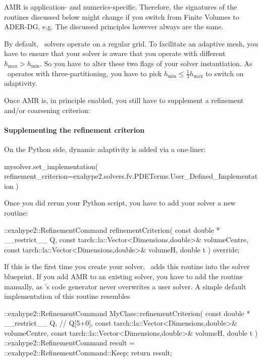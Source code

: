 \begin{remark}
 AMR is application- and numerics-specific. Therefore, the signatures of the
 routines discussed below might change if you switch from Finite Volumes to
 ADER-DG, e.g. The discussed principles however always are the same.
\end{remark}


By default, \ExaHyPE\ solvers operate on a regular grid.
To facilitate an adaptive mesh, you have to ensure that your solver is aware that you operate 
with different $h_{\text{max}}>h_{\text{min}}$. 
So you have to alter these two flags of your solver instantiation.
As \Peano\ operates with three-partitioning, you have to pick 
$h_{\text{min}} \leq \frac{1}{3} h_{\text{max}}$ to switch on adaptivity.

Once AMR is, in principle enabled, you still have to supplement a refinement and/or coarsening criterion:



\paragraph{Supplementing the refinement criterion}
%
On the Python side, dynamic adaptivity is added via a one-liner:

\begin{code}
mysolver.set_implementation(
 refinement_criterion=exahype2.solvers.fv.PDETerms.User_Defined_Implementation 
)
\end{code}


\noindent
Once you did rerun your Python script, you have to add your solver a new
routine:

\begin{code}
::exahype2::RefinementCommand refinementCriterion(
  const double * __restrict__ Q,
  const tarch::la::Vector<Dimensions,double>&  volumeCentre,
  const tarch::la::Vector<Dimensions,double>&  volumeH,
  double                                       t
) override;
\end{code}


\noindent
If this is the first time you create your solver, \ExaHyPE\ adds this routine
into the solver blueprint.
If you add AMR to an existing solver, you have to add the routine manually, as
\ExaHyPE's code generator never overwrites a user solver.
A simple default implementation of this routine resembles

\begin{code}
::exahype2::RefinementCommand MyClass::refinementCriterion(
  const double * __restrict__ Q, // Q[5+0],
  const tarch::la::Vector<Dimensions,double>&  volumeCentre,
  const tarch::la::Vector<Dimensions,double>&  volumeH,
  double                                       t
) {
  ::exahype2::RefinementCommand result = ::exahype2::RefinementCommand::Keep;
  return result;
}
\end{code}


